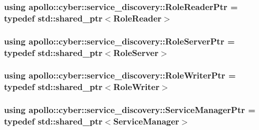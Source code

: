\hypertarget{namespaceapollo_1_1cyber_1_1service__discovery_a59f1f32faed73356751837c33e6a34fa}{
\subsubsection[{Role\-Reader\-Ptr}]{\setlength{\rightskip}{0pt plus 5cm}using {\bf apollo\-::cyber\-::service\-\_\-discovery\-::\-Role\-Reader\-Ptr} = typedef std\-::shared\-\_\-ptr$<${\bf Role\-Reader}$>$}}\label{namespaceapollo_1_1cyber_1_1service__discovery_a59f1f32faed73356751837c33e6a34fa}
\hypertarget{namespaceapollo_1_1cyber_1_1service__discovery_a247914445b59846191483e1e1f2005a6}{
\subsubsection[{Role\-Server\-Ptr}]{\setlength{\rightskip}{0pt plus 5cm}using {\bf apollo\-::cyber\-::service\-\_\-discovery\-::\-Role\-Server\-Ptr} = typedef std\-::shared\-\_\-ptr$<${\bf Role\-Server}$>$}}\label{namespaceapollo_1_1cyber_1_1service__discovery_a247914445b59846191483e1e1f2005a6}
\hypertarget{namespaceapollo_1_1cyber_1_1service__discovery_ad246cadc25c6cbfc2320ab309b5c60f4}{
\subsubsection[{Role\-Writer\-Ptr}]{\setlength{\rightskip}{0pt plus 5cm}using {\bf apollo\-::cyber\-::service\-\_\-discovery\-::\-Role\-Writer\-Ptr} = typedef std\-::shared\-\_\-ptr$<${\bf Role\-Writer}$>$}}\label{namespaceapollo_1_1cyber_1_1service__discovery_ad246cadc25c6cbfc2320ab309b5c60f4}
\hypertarget{namespaceapollo_1_1cyber_1_1service__discovery_a257bddadfae4c3b6efbc25c6d63c28f9}{
\subsubsection[{Service\-Manager\-Ptr}]{\setlength{\rightskip}{0pt plus 5cm}using {\bf apollo\-::cyber\-::service\-\_\-discovery\-::\-Service\-Manager\-Ptr} = typedef std\-::shared\-\_\-ptr$<${\bf Service\-Manager}$>$}}\label{namespaceapollo_1_1cyber_1_1service__discovery_a257bddadfae4c3b6efbc25c6d63c28f9}


